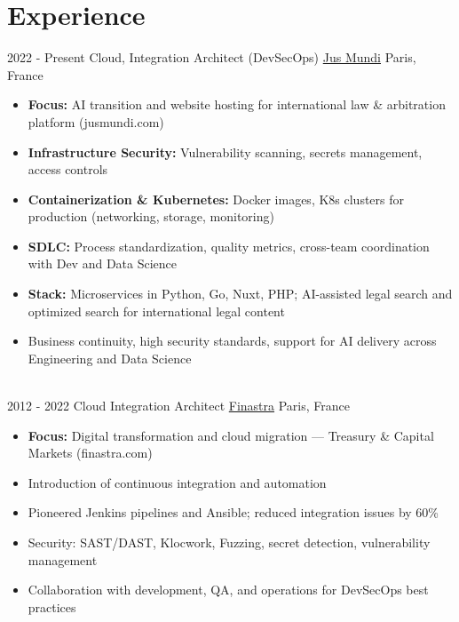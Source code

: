\documentclass[letterpaper]{twentysecondcv} %
\begin{document}
\makeprofile %


\section{Experience}

\begin{twentytimeline}
	\twentyitemtimeline{\faCloud}
		{2022 -}
		{Present}
		{Cloud, Integration Architect (DevSecOps)}
		{\href{https://www.jusmundi.com}{Jus Mundi}}
		{Paris, France}
		{\begin{itemize}
		\item \textbf{Focus:} AI transition and website hosting for international law \& arbitration platform (jusmundi.com)
		\item \textbf{Infrastructure Security:} Vulnerability scanning, secrets management, access controls
		\item \textbf{Containerization \& Kubernetes:} Docker images, K8s clusters for production (networking, storage, monitoring)
		\item \textbf{SDLC:} Process standardization, quality metrics, cross-team coordination with Dev and Data Science
		\item \textbf{Stack:} Microservices in Python, Go, Nuxt, PHP; AI-assisted legal search and optimized search for international legal content
		\item Business continuity, high security standards, support for AI delivery across Engineering and Data Science
		\end{itemize}}
	\\
	\twentyitemtimeline{\faUsers}
		{2012 -}
		{2022}
		{Cloud Integration Architect}
		{\href{https://finastra.com}{Finastra}}
		{Paris, France}
		{\begin{itemize}
		\item \textbf{Focus:} Digital transformation and cloud migration — Treasury \& Capital Markets (finastra.com)
		\item Introduction of continuous integration and automation
		\item Pioneered Jenkins pipelines and Ansible; reduced integration issues by 60\%
		\item Security: SAST/DAST, Klocwork, Fuzzing, secret detection, vulnerability management
		\item Collaboration with development, QA, and operations for DevSecOps best practices

\end{itemize}}
\end{twentytimeline}
\end{document}

